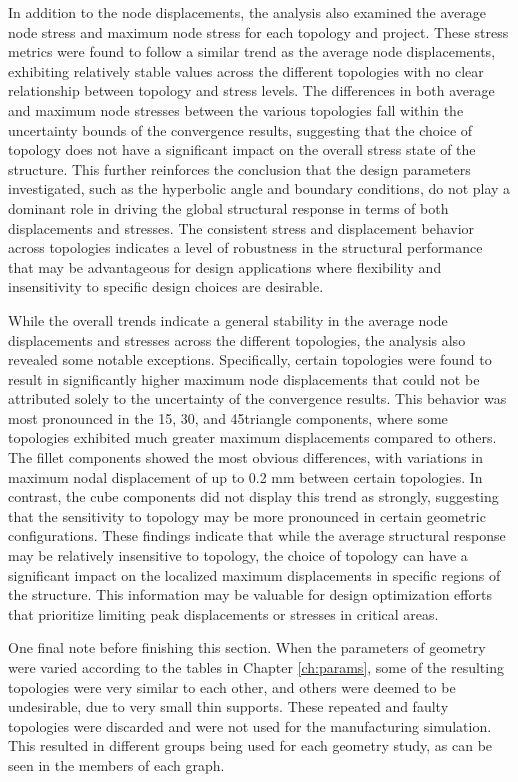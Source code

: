\documentclass[../main.tex]{subfiles}
\begin{document}
In addition to the node displacements, the analysis also examined the average node stress and maximum node stress for each topology and project. These stress metrics were found to follow a similar trend as the average node displacements, exhibiting relatively stable values across the different topologies with no clear relationship between topology and stress levels. The differences in both average and maximum node stresses between the various topologies fall within the uncertainty bounds of the convergence results, suggesting that the choice of topology does not have a significant impact on the overall stress state of the structure. This further reinforces the conclusion that the design parameters investigated, such as the hyperbolic angle and boundary conditions, do not play a dominant role in driving the global structural response in terms of both displacements and stresses. The consistent stress and displacement behavior across topologies indicates a level of robustness in the structural performance that may be advantageous for design applications where flexibility and insensitivity to specific design choices are desirable.

While the overall trends indicate a general stability in the average node displacements and stresses across the different topologies, the analysis also revealed some notable exceptions. Specifically, certain topologies were found to result in significantly higher maximum node displacements that could not be attributed solely to the uncertainty of the convergence results. This behavior was most pronounced in the 15\degree, 30\degree, and 45\degree triangle components, where some topologies exhibited much greater maximum displacements compared to others. The fillet components showed the most obvious differences, with variations in maximum nodal displacement of up to 0.2 mm between certain topologies. In contrast, the cube components did not display this trend as strongly, suggesting that the sensitivity to topology may be more pronounced in certain geometric configurations. These findings indicate that while the average structural response may be relatively insensitive to topology, the choice of topology can have a significant impact on the localized maximum displacements in specific regions of the structure. This information may be valuable for design optimization efforts that prioritize limiting peak displacements or stresses in critical areas.

One final note before finishing this section. When the parameters of geometry were varied according to the tables in Chapter \ref{ch:params}, some of the resulting topologies were very similar to each other, and others were deemed to be undesirable, due to very small thin supports. These repeated and faulty topologies were discarded and were not used for the manufacturing simulation. This resulted in different groups being used for each geometry study, as can be seen in the members of each graph.
\end{document}
